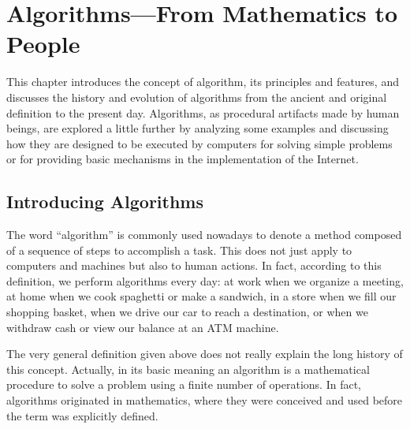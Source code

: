 






%

\setcounter{chapter}{0}

\chapter{\label{chap:1}Algorithms---From Mathematics to People}


\noindent This chapter introduces the concept of algorithm, its principles and features, and discusses the history and evolution of algorithms from the ancient and original definition to the present day. Algorithms, as procedural artifacts made by human beings, are explored a little further by analyzing some examples and discussing how they are designed to be executed by computers for solving simple problems or for providing basic mechanisms in the implementation of the Internet.



\section{\label{sec:1.1}Introducing Algorithms}


The word ``algorithm'' is commonly used nowadays to denote a method composed of a sequence of steps to accomplish a task. This does not just apply to computers and machines but also to human actions. In fact, according to this definition, we perform algorithms every day: at work when we organize a meeting, at home when we cook spaghetti or make a sandwich, in a store when we fill our shopping basket, when we drive our car to reach a destination, or when we withdraw cash or view our balance at an ATM machine.

The very general definition given above does not really explain the long history of this concept. Actually, in its basic meaning an algorithm is a mathematical procedure to solve a problem using a finite number of operations. In fact, algorithms originated in mathematics, where they were conceived and used before the term was explicitly defined.


